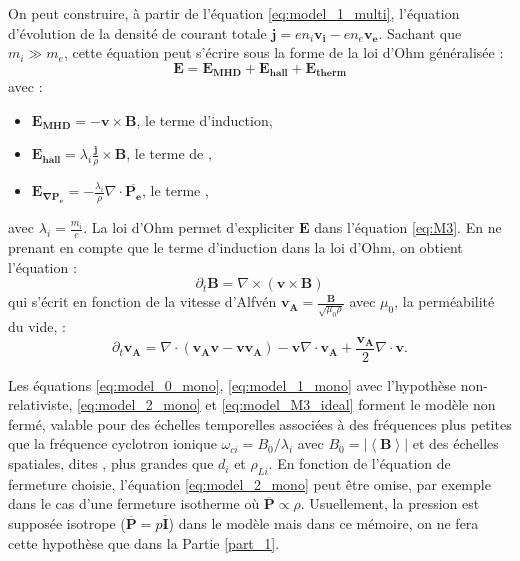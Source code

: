 On peut construire, à partir de l'équation \eqref{eq:model_1_multi}, l'équation d'évolution de la densité de courant totale $\boldsymbol{j} = e n_i \boldsymbol{v_i} - e n_e \boldsymbol{v_e}$. Sachant que $m_i \gg m_e$, cette équation peut s'écrire sous la forme de la loi d'Ohm généralisée : \begin{equation} 
\boldsymbol{E} =  \boldsymbol{E_{MHD}} +  \boldsymbol{E_{hall}} +  \boldsymbol{E_{therm}} \label{eq:ohm} 
\end{equation}
avec :
\begin{itemize}
 \item $\boldsymbol{E_{MHD}} =  - \boldsymbol{v} \times \boldsymbol{B}$, le terme d'induction,
 \item $\boldsymbol{E_{hall}} = \lambda_i \frac{\boldsymbol{j}}{\rho} \times \boldsymbol{B}$, le terme de ,
 \item $\boldsymbol{E_{\nabla P_e}} = - \frac{\lambda_i}{\rho} \nabla \cdot \overline{\boldsymbol{P_{e}}}$,  le terme ,
\end{itemize}
avec $\lambda_i = \frac{m_i}{e}$. La loi d'Ohm permet d'expliciter $\boldsymbol{E}$ dans l'équation \eqref{eq:M3}. En ne prenant en compte que le terme d'induction dans la loi d'Ohm, on obtient l'équation : 
\begin{equation}
    \label{eq:model_M3_ideal} \partial_t \boldsymbol{B} = \nabla \times \left(\boldsymbol{v} \times \boldsymbol{B} \right)
\end{equation}
qui s'écrit en fonction de la vitesse d'Alfvén $\boldsymbol{v_A} = \frac{\boldsymbol{B}}{\sqrt{\mu_0 \rho}}$ avec $\mu_0$, la perméabilité du vide, : 
\begin{equation}
\label{eq:model_M3_idealvA} \partial_t \boldsymbol{v_A}  =   \nabla \cdot \left(\boldsymbol{v_A}\boldsymbol{v} - \boldsymbol{v}\boldsymbol{v_A}\right) -  \boldsymbol{v}  \nabla \cdot \boldsymbol{v_A} +  \frac{\boldsymbol{v_A}}{2}  \nabla \cdot \boldsymbol{v}. \end{equation}

Les équations \eqref{eq:model_0_mono}, \eqref{eq:model_1_mono} avec l'hypothèse non-relativiste, \eqref{eq:model_2_mono} et  \eqref{eq:model_M3_ideal} forment le modèle  non fermé, valable pour des échelles temporelles associées à des fréquences plus petites que la fréquence cyclotron ionique $\omega_{ci} = B_0/\lambda_i$ avec $B_0 = |\left<\boldsymbol{B}\right>|$ et des échelles spatiales, dites , plus grandes que $d_i$ et $\rho_{Li}$. En fonction de l'équation de fermeture choisie, l'équation \eqref{eq:model_2_mono} peut être omise, par exemple dans le cas d'une fermeture isotherme où $\overline{\boldsymbol{P}} \propto \rho$.
Usuellement, la pression est supposée isotrope ($\overline{\boldsymbol{P}} = p \overline{\boldsymbol{I}}$) dans le modèle  mais dans ce mémoire, on ne fera cette hypothèse que dans la Partie \ref{part_1}. 

